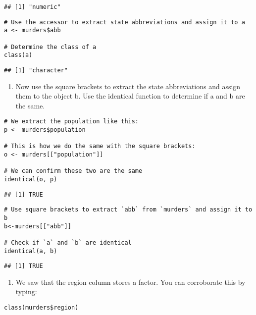 \documentclass[
]{article}
\providecommand{\tightlist}{%
  \setlength{\itemsep}{0pt}\setlength{\parskip}{0pt}}
\begin{document}
\begin{verbatim}
## [1] "numeric"
\end{verbatim}

\begin{verbatim}
# Use the accessor to extract state abbreviations and assign it to a
a <- murders$abb

# Determine the class of a
class(a)
\end{verbatim}

\begin{verbatim}
## [1] "character"
\end{verbatim}

\begin{enumerate}
\def\labelenumi{\arabic{enumi}.}
\setcounter{enumi}{3}
\tightlist
\item
  Now use the square brackets to extract the state abbreviations and
  assign them to the object b. Use the identical function to determine
  if a and b are the same.
\end{enumerate}

\begin{verbatim}
# We extract the population like this:
p <- murders$population

# This is how we do the same with the square brackets:
o <- murders[["population"]] 

# We can confirm these two are the same
identical(o, p)
\end{verbatim}

\begin{verbatim}
## [1] TRUE
\end{verbatim}

\begin{verbatim}
# Use square brackets to extract `abb` from `murders` and assign it to b
b<-murders[["abb"]]

# Check if `a` and `b` are identical 
identical(a, b)
\end{verbatim}

\begin{verbatim}
## [1] TRUE
\end{verbatim}

\begin{enumerate}
\def\labelenumi{\arabic{enumi}.}
\setcounter{enumi}{4}
\tightlist
\item
  We saw that the region column stores a factor. You can corroborate
  this by typing:
\end{enumerate}

\begin{verbatim}
class(murders$region)
\end{verbatim}
\end{document}
